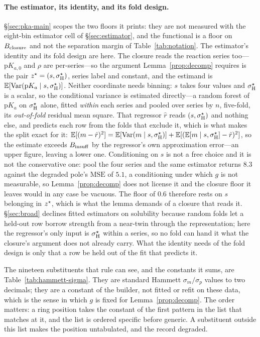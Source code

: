 \paragraph{The estimator, its identity, and its fold design.}
\label{par:pka-folds}
\S\ref{sec:pka-main} scopes the two floors it prints: they are not measured with the eight-bin
estimator cell of \S\ref{sec:estimator}, and the functional is a floor on $B_{\mathrm{closure}}$ and not the
separation margin of Table~\ref{tab:notation}. The estimator's identity and its fold design are
here. The closure reads the reaction series too---$\mathrm pK_{a,0}$
and $\rho$ are per-series---so the argument Lemma~\ref{prop:decomp} requires is the pair
$z^\star=(s,\sigma_{\mathrm H}^\star)$, series label and constant, and the estimand is
$\mathbb{E}[\mathrm{Var}(\mathrm pK_a\mid s,\sigma_{\mathrm H}^\star)]$. Neither coordinate needs binning: $s$ takes four values and
$\sigma_{\mathrm H}^\star$ is a scalar, so the conditional variance is estimated directly---a random forest of
$\mathrm pK_a$ on $\sigma_{\mathrm H}^\star$ alone, fitted \emph{within} each series and pooled over series by $n$,
five-fold, its \emph{out-of-fold} residual mean square. That regressor $\hat r$ reads $(s,\sigma_{\mathrm H}^\star)$
and nothing else, and predicts each row from the folds that exclude it, which is what makes the split
exact for it:
$\mathbb{E}[(m-\hat r)^2]=\mathbb{E}[\mathrm{Var}(m\mid s,\sigma_{\mathrm H}^\star)]+\mathbb{E}[(\mathbb{E}[m\mid s,\sigma_{\mathrm H}^\star]-\hat r)^2]$, so the estimate
exceeds $B_{\mathrm{insuff}}$ by the regressor's own approximation error---an upper figure, leaving a lower one.
Conditioning on $s$ is not a free choice and it is not the conservative one: pool the four series and
the same estimator returns $8.3$ against the degraded pole's $\mathrm{MSE}$ of $5.1$, a conditioning
under which $g$ is not measurable, so Lemma~\ref{prop:decomp} does not license it and the closure
floor it leaves would in any case be vacuous. The floor of $0.6$ therefore rests on $s$ belonging in
$z^\star$, which is what the lemma demands of a closure that reads it.
\S\ref{sec:broad} declines fitted estimators on solubility because random folds let a held-out row
borrow strength from a near-twin through the representation; here the regressor's only input is
$\sigma_{\mathrm H}^\star$ within a series, so no fold can hand it what the closure's argument does not
already carry. What the identity needs of the fold design is only that a row be held out of the fit
that predicts it.

The nineteen substituents that rule can see, and the constants it sums, are
Table~\ref{tab:hammett-sigma}. They are standard Hammett $\sigma_m/\sigma_p$ values
\cite{hansch1991survey} to two decimals; they are a constant of the builder, not fitted or refit on
these data, which is the sense in which $g$ is fixed for Lemma~\ref{prop:decomp}. The order matters:
a ring position takes the constant of the first pattern in the list that matches at it, and the list
is ordered specific before generic. A substituent outside this list makes the position untabulated,
and the record degraded.

